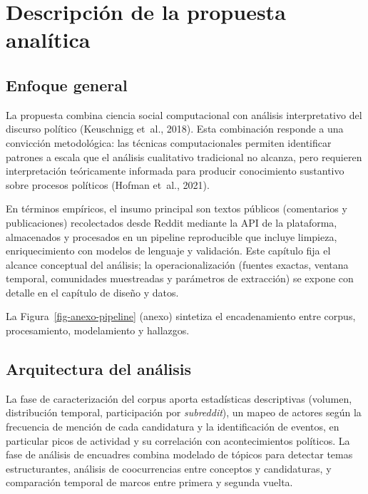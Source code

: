 \documentclass[
  letterpaper,
  numbers=noendperiod,
  fontsize=11pt,
  DIV=12,
  titlepage=false]{scrreprt}
\begin{document}
\section{Descripción de la propuesta
analítica}\label{descripciuxf3n-de-la-propuesta-analuxedtica}

\subsection{Enfoque general}\label{enfoque-general}

La propuesta combina ciencia social computacional con análisis
interpretativo del discurso político (Keuschnigg et~al., 2018). Esta
combinación responde a una convicción metodológica: las técnicas
computacionales permiten identificar patrones a escala que el análisis
cualitativo tradicional no alcanza, pero requieren interpretación
teóricamente informada para producir conocimiento sustantivo sobre
procesos políticos (Hofman et~al., 2021).

En términos empíricos, el insumo principal son textos públicos
(comentarios y publicaciones) recolectados desde Reddit mediante la API
de la plataforma, almacenados y procesados en un pipeline reproducible
que incluye limpieza, enriquecimiento con modelos de lenguaje y
validación. Este capítulo fija el alcance conceptual del análisis; la
operacionalización (fuentes exactas, ventana temporal, comunidades
muestreadas y parámetros de extracción) se expone con detalle en el
capítulo de diseño y datos.

La Figura~\ref{fig-anexo-pipeline} (anexo) sintetiza el encadenamiento
entre corpus, procesamiento, modelamiento y hallazgos.

\subsection{Arquitectura del
análisis}\label{arquitectura-del-anuxe1lisis}

La fase de caracterización del corpus aporta estadísticas descriptivas
(volumen, distribución temporal, participación por \emph{subreddit}), un
mapeo de actores según la frecuencia de mención de cada candidatura y la
identificación de eventos, en particular picos de actividad y su
correlación con acontecimientos políticos. La fase de análisis de
encuadres combina modelado de tópicos para detectar temas
estructurantes, análisis de coocurrencias entre conceptos y
candidaturas, y comparación temporal de marcos entre primera y segunda
vuelta.
\end{document}

